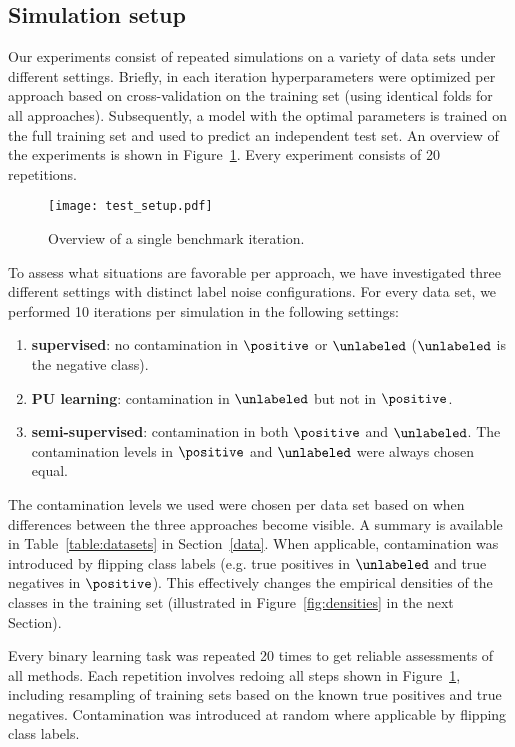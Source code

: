 \subsection{Simulation setup} 
Our experiments consist of repeated simulations on a variety of data sets under different settings. Briefly, in each iteration hyperparameters were optimized per approach based on cross-validation on the training set (using identical folds for all approaches). Subsequently, a model with the optimal parameters is trained on the full training set and used to predict an independent test set. An overview of the experiments is shown in Figure~\ref{fig:benchmark}. Every experiment consists of 20 repetitions. 

\begin{figure}[!h]
  \centering
  \texttt{[image: test\_setup.pdf]}
  \caption{Overview of a single benchmark iteration.} 
  \label{fig:benchmark}
\end{figure}

To assess what situations are favorable per approach, we have investigated three different settings with distinct label noise configurations. For every data set, we performed 10 iterations per simulation in the following settings:
\begin{enumerate}
\item \textbf{supervised}: no contamination in $\positive$ or $\unlabeled$ ($\unlabeled$ is the negative class).
\item \textbf{PU learning}: contamination in $\unlabeled$ but not in $\positive$. %
\item \textbf{semi-supervised}: contamination in both $\positive$ and $\unlabeled$. The contamination levels in $\positive$ and $\unlabeled$ were always chosen equal.
\end{enumerate}

The contamination levels we used were chosen per data set based on when differences between the three approaches become visible. A summary is available in Table~\ref{table:datasets} in Section~\ref{data}. When applicable, contamination was introduced by flipping class labels (e.g. true positives in $\unlabeled$ and true negatives in $\positive$). This effectively changes the empirical densities of the classes in the training set (illustrated in Figure~\ref{fig:densities} in the next Section).

Every binary learning task was repeated 20 times to get reliable assessments of all methods. Each repetition involves redoing all steps shown in Figure~\ref{fig:benchmark}, including resampling of training sets based on the known true positives and true negatives. Contamination was introduced at random where applicable by flipping class labels.%

